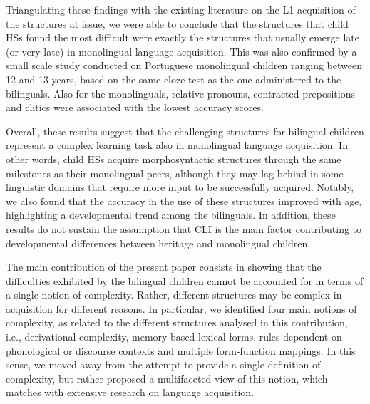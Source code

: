 \documentclass[output=paper]{langscibook}
\begin{document}
Triangulating these findings with the existing literature on the L1 acquisition of the structures at issue, we were able to conclude that the structures that child HSs found the most difficult were exactly the structures that usually emerge late (or very late) in monolingual language acquisition. This was also confirmed by a small scale study conducted on Portuguese monolingual children ranging between 12 and 13 years, based on the same cloze-test as the one administered to the bilinguals. Also for the monolinguals, relative pronouns, contracted prepositions and clitics were associated with the lowest accuracy scores. 

Overall, these results suggest that the challenging structures for bilingual children represent a complex learning task also in monolingual language acquisition. In other words, child HSs acquire morphosyntactic structures through the same milestones as their monolingual peers, although they may lag behind in some linguistic domains that require more input to be successfully acquired. Notably, we also found that the accuracy in the use of these structures improved with age, highlighting a developmental trend among the bilinguals. In addition, these results do not sustain the assumption that CLI is the main factor contributing to developmental differences between heritage and monolingual children.

The main contribution of the present paper consists in showing that the difficulties exhibited by the bilingual children cannot be accounted for in terms of a single notion of complexity. Rather, different structures may be complex in acquisition for different reasons. In particular, we identified four main notions of complexity, as related to the different structures analysed in this contribution, i.e., derivational complexity, memory-based lexical forms, rules dependent on phonological or discourse contexts and multiple form-function mappings. In this sense, we moved away from the attempt to provide a single definition of complexity, but rather proposed a multifaceted view of this notion, which matches with extensive research on language acquisition.

\printbibliography[heading=subbibliography,notkeyword=this]
\end{document}
